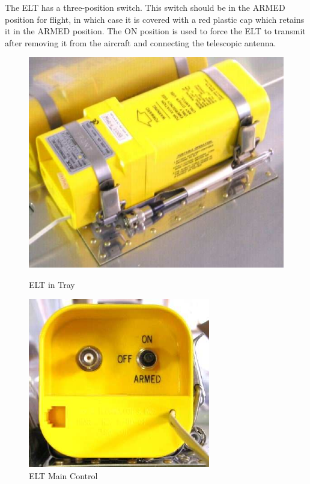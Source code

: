 The ELT has a three-position switch. This switch should be in the ARMED position for flight, in which case it is covered with a red plastic cap which retains it in the ARMED position. The ON position is used to force the ELT to transmit after removing it from the aircraft and connecting the telescopic antenna. 
\begin{figure}
[htb]

% 
\centering 
\begin{minipage}{3in}

%
\centering 
\includegraphics[scale=0.8]{../Diagrams/elt2} \caption{ELT in Tray} 
\end{minipage}

% 
\qquad 
\begin{minipage}{3in}

%
\centering 
\includegraphics[scale=1]{../Diagrams/elt3} \caption{ELT Main Control}

% 
\end{minipage}

% 
\end{figure}


